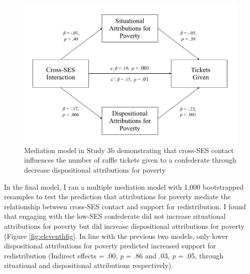 \documentclass{sfuthesis}
\begin{document}
\begin{figure}
  \begin{center}
    \includegraphics[scale=.75]{Fig4-4.png}
    \caption{Mediation model in Study 3b demonstrating that cross-SES contact influences the number of raffle tickets given to a confederate through decrease dispositional attributions for poverty}
    \label{fig:tenthfig}
  \end{center}
\end{figure}

In the final model, I ran a multiple mediation model with 1,000 bootstrapped resamples to test the prediction that attributions for poverty mediate the relationship between cross-SES contact and support for redistribution. I found that engaging with the low-SES confederate did not increase situational attributions for poverty but did increase dispositional attributions for poverty (Figure \ref{fig:eleventhfig}. In line with the previous two models, only lower dispositional attributions for poverty predicted increased support for redistribution (Indirect effects = .00, \textit{p} = .86 and .03, \textit{p} = .05, through situational and dispositional attributions respectively). 
\end{document}
